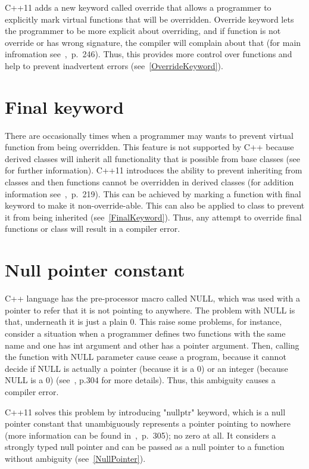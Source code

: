 \documentclass[11pt]{report}
\begin{document}
C++11 adds a new keyword called override that allows a programmer to explicitly mark virtual functions that will be overridden. Override keyword lets the programmer to be more explicit about overriding, and if function is not override or has wrong signature, the compiler will complain about that (for main infromation see~\cite{Gregorie:professionalcpp},~p.~246). Thus, this provides more control over functions and help to prevent inadvertent errors (see~\ref{OverrideKeyword}).

\section{Final keyword}
\label{section: Final keyword}
There are occasionally times when a programmer may wants to prevent virtual function from being overridden. This feature is not supported by C++ because derived classes will inherit all functionality that is possible from base classes (see~\cite{Stroustrup:2012:Cpp11} for further information). C++11 introduces the ability to prevent inheriting from classes and then functions cannot be overridden in derived classes (for addition information see~\cite{Gregorie:professionalcpp},~p.~219). This can be achieved by marking a function with final keyword to make it non-override-able. This can also be applied to class to prevent it from being inherited (see~\ref{FinalKeyword}). Thus, any attempt to override final functions or class will result in a compiler error.

\section{Null pointer constant}
\label{section: Null pointer constant}
C++ language has the pre-processor macro called NULL, which was used with a pointer to refer that it is not pointing to anywhere. The problem with NULL is that, underneath it is just a plain 0. This raise some problems, for instance, consider a situation when a programmer defines two functions with the same name and one has int argument and other has a pointer argument. Then, calling the function with NULL parameter cause cease a program, because it cannot decide if NULL is actually a pointer (because it is a 0) or an integer (because NULL is a 0) (see~\cite{Gregorie:professionalcpp}, p.304 for more details). Thus, this ambiguity causes a compiler error.

C++11 solves this problem by introducing "nullptr" keyword, which is a null pointer constant that unambiguously represents a pointer pointing to nowhere (more information can be found in~\cite{Gregorie:professionalcpp},~p.~305); no zero at all. It considers a strongly typed null pointer and can be passed as a null pointer to a function without ambiguity (see~\ref{NullPointer}). 
\end{document}
